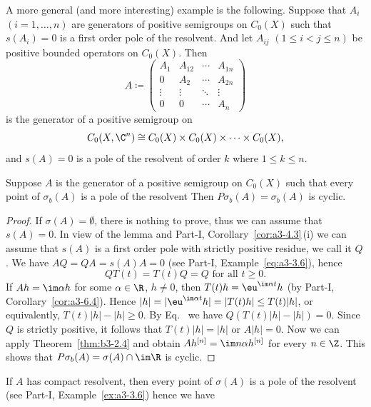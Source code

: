 A more general (and more interesting) example is the following.
Suppose that $A_{i}$ $(i = 1,\ldots,n)$ are generators of positive semigroups on $C_{0}(X)$ such that $s(A_{i}) = 0$ is a first order pole of the resolvent.
And let $A_{ij}$ $(1 \leq i < j \leq n)$ be positive bounded operators on $C_{0}(X)$.
Then
\[
A \coloneqq \begin{pmatrix}
	A_{1} & A_{12} & \cdots & A_{1n} \\
	0 & A_{2} & \cdots & A_{2n} \\
	\vdots & \vdots & \ddots & \vdots \\
	0 & 0 & \cdots & A_{n}
\end{pmatrix}
\]
is the generator of a positive semigroup on 
%
\[
	C_{0}(X,\C^{n}) \cong C_{0}(X) \times C_{0}(X) \times \cdots \times C_{0}(X) , 
\]
%
and $s(A) = 0$ is a pole of the resolvent of order $k$ where $1 \leq k \leq n$.
\begin{theorem}\label{thm:b3-2.9}
Suppose $A$ is the generator of a positive semigroup on $C_{0}(X)$ such that every point of\/ $\sigma_{b}(A)$ is a pole of the resolvent
Then $P\sigma_{b}(A) = \sigma_{b}(A)$ is cyclic.
\end{theorem}
\begin{proof}
	If\/ $\sigma(A) = \emptyset$, there is nothing to prove, thus we can assume that $s(A) = 0$.
	In view of the lemma and Part-I, Corollary~\ref{cor:a3-4.3}\,(i) we can assume that $s(A)$ is a first order pole with strictly positive residue, we call it $Q$.
	We have $AQ = QA = s(A)A = 0$ (see Part-I, Example~\ref{eq:a3-3.6}), hence
	\begin{equation}\label{eq:b3-2.18}
		QT(t) = T(t)Q = Q \text{ for all } t \geq 0.
	\end{equation}
	If\/ $Ah = \im\alpha h$ for some $\alpha \in \R$, $h \neq 0$, then $T(t)h = \eu^{\im\alpha t}h$ (by Part-I, Corollary~\ref{cor:a3-6.4}).
	Hence $|h| = |\eu^{\im\alpha t}h| = |T(t)h| \leq T(t)|h|$, or equivalently, $T(t)|h| - |h| \geq 0$.
	By Eq.~ we have $Q(T(t)|h| - |h|) = 0$.
	Since $Q$ is strictly positive, it follows that $T(t)|h| = |h|$ or $A|h| = 0$.
	Now we can apply Theorem~\ref{thm:b3-2.4} and obtain $Ah^{[n]} = \im n\alpha h^{[n]}$ for every $n \in \Z$.
	This shows that $P\sigma_{b}(A) = \sigma(A) \cap \im\R$ is cyclic.
\end{proof}
If\/ $A$ has compact resolvent, then every point of\/ $\sigma(A)$ is a pole of the resolvent (see Part-I, Example~\ref{ex:a3-3.6}) hence we have

